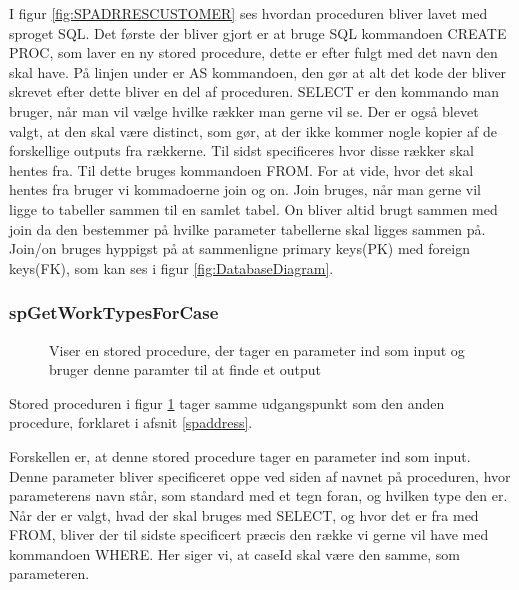 I figur \ref{fig:SPADRRESCUSTOMER} ses hvordan proceduren bliver lavet med sproget SQL. Det første der bliver gjort er at bruge SQL kommandoen CREATE PROC, som laver en ny stored procedure, dette er efter fulgt med det navn den skal have.
På linjen under er AS kommandoen, den gør at alt det kode der bliver skrevet efter dette bliver en del af proceduren.
SELECT er den kommando man bruger, når man vil vælge hvilke rækker man gerne vil se.
Der er også blevet valgt, at den skal være distinct, som gør, at der ikke kommer nogle kopier af de forskellige outputs fra rækkerne.
Til sidst specificeres hvor disse rækker skal hentes fra.
Til dette bruges kommandoen FROM.
For at vide, hvor det skal hentes fra bruger vi kommadoerne join og on.
Join bruges, når man gerne vil ligge to tabeller sammen til en samlet tabel.
On bliver altid brugt sammen med join da den bestemmer på hvilke parameter tabellerne skal ligges sammen på.
Join/on bruges hyppigst på at sammenligne primary keys(PK) med foreign keys(FK), som kan ses i figur \ref{fig:DatabaseDiagram}.

\subsubsection{spGetWorkTypesForCase}
\begin{figure}[H]
    \caption{Viser en stored procedure, der tager en parameter ind som input og bruger denne paramter til at finde et output}
    \label{fig:SPWORKTYPE}
\end{figure}

Stored proceduren i figur \ref{fig:SPWORKTYPE} tager samme udgangspunkt som den anden procedure, forklaret i afsnit \ref{spaddress}.

Forskellen er, at denne stored procedure tager en parameter ind som input.
Denne parameter bliver specificeret oppe ved siden af navnet på proceduren, hvor parameterens navn står, som standard med et \@ tegn foran, og hvilken type den er.
Når der er valgt, hvad der skal bruges med SELECT, og hvor det er fra med FROM, bliver der til sidste specificert præcis den række vi gerne vil have med kommandoen WHERE.
Her siger vi, at caseId skal være den samme, som parameteren.

